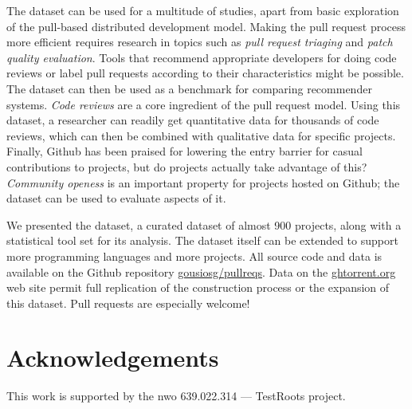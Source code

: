 \documentclass{sig-alternate}
\begin{document}
The \pullreqs dataset can be used for a multitude of studies, apart from basic
exploration of the pull-based distributed development model. Making the pull
request process more efficient requires research in topics such as \emph{pull
request triaging} and \emph{patch quality evaluation}.  Tools that recommend
appropriate developers for doing code reviews or label pull requests according
to their characteristics might be possible. The dataset can then be used as a
benchmark for comparing recommender systems. \emph{Code reviews} are a core
ingredient of the pull request model. Using this dataset, a researcher can
readily get quantitative data for thousands of code reviews, which can then be
combined with qualitative data for specific projects.  Finally, Github has been
praised for lowering the entry barrier for casual contributions to projects, but
do projects actually take advantage of this? \emph{Community openess} is an
important property for projects hosted on Github; the \pullreqs dataset can be
used to evaluate aspects of it.

We presented the \pullreqs dataset, a curated dataset of almost 900 projects,
along with a statistical tool set for its analysis. The
dataset itself can be extended to support more programming languages and more
projects. All source code and data is available on the Github repository
\href{https://github.com/gousiosg/pullreqs}{gousiosg/pullreqs}. Data on the
\href{http://ghtorrent.org}{ghtorrent.org} web site permit full replication
of the construction process or the expansion of this dataset.
Pull requests are especially welcome!

\section{Acknowledgements}
This work is supported by the {\sc nwo} 639.022.314 --- TestRoots project.


\balance

  
\end{document}
